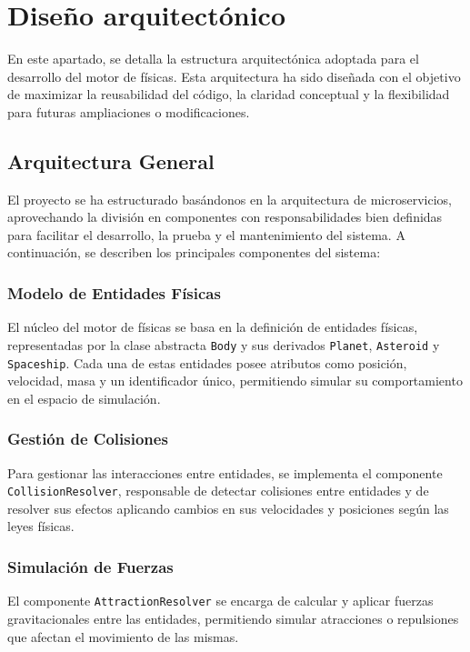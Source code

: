\section{Diseño arquitectónico}
En este apartado, se detalla la estructura arquitectónica adoptada para el desarrollo del motor de físicas. Esta arquitectura ha sido diseñada con el objetivo de maximizar la reusabilidad del código, la claridad conceptual y la flexibilidad para futuras ampliaciones o modificaciones.

\subsection{Arquitectura General}

El proyecto se ha estructurado basándonos en la arquitectura de microservicios\cite{microservices_io}, aprovechando la división en componentes con responsabilidades bien definidas para facilitar el desarrollo, la prueba y el mantenimiento del sistema. A continuación, se describen los principales componentes del sistema:

\subsubsection{Modelo de Entidades Físicas}
El núcleo del motor de físicas se basa en la definición de entidades físicas, representadas por la clase abstracta \texttt{Body} y sus derivados \texttt{Planet}, \texttt{Asteroid} y \texttt{Spaceship}. Cada una de estas entidades posee atributos como posición, velocidad, masa y un identificador único, permitiendo simular su comportamiento en el espacio de simulación.

\subsubsection{Gestión de Colisiones}
Para gestionar las interacciones entre entidades, se implementa el componente \texttt{CollisionResolver}, responsable de detectar colisiones entre entidades y de resolver sus efectos aplicando cambios en sus velocidades y posiciones según las leyes físicas.

\subsubsection{Simulación de Fuerzas}
El componente \texttt{AttractionResolver} se encarga de calcular y aplicar fuerzas gravitacionales entre las entidades, permitiendo simular atracciones o repulsiones que afectan el movimiento de las mismas.


